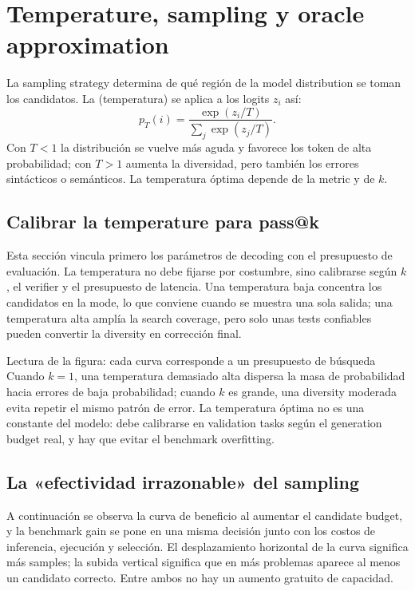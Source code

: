 \section{Temperature, sampling y oracle approximation}

La sampling strategy determina de qué región de la model distribution se toman los candidatos. La  (temperatura) se aplica a los logits $z_i$ así:
\[
p_T(i)=\frac{\exp(z_i/T)}{\sum_j\exp(z_j/T)}.
\]
Con $T<1$ la distribución se vuelve más aguda y favorece los token de alta probabilidad; con $T>1$ aumenta la diversidad, pero también los errores sintácticos o semánticos. La temperatura óptima depende de la metric y de $k$.

\subsection{Calibrar la temperature para pass@k}

Esta sección vincula primero los parámetros de decoding con el presupuesto de evaluación. La temperatura no debe fijarse por costumbre, sino calibrarse según $k$, el verifier y el presupuesto de latencia. Una temperatura baja concentra los candidatos en la mode, lo que conviene cuando se muestra una sola salida; una temperatura alta amplía la search coverage, pero solo unas tests confiables pueden convertir la diversity en corrección final.


\begin{knowledgebox}{Lectura de la figura: cada curva corresponde a un presupuesto de búsqueda}
Cuando $k=1$, una temperatura demasiado alta dispersa la masa de probabilidad hacia errores de baja probabilidad; cuando $k$ es grande, una diversity moderada evita repetir el mismo patrón de error. La temperatura óptima no es una constante del modelo: debe calibrarse en validation tasks según el generation budget real, y hay que evitar el benchmark overfitting.
\end{knowledgebox}

\subsection{La «efectividad irrazonable» del sampling}

A continuación se observa la curva de beneficio al aumentar el candidate budget, y la benchmark gain se pone en una misma decisión junto con los costos de inferencia, ejecución y selección. El desplazamiento horizontal de la curva significa más samples; la subida vertical significa que en más problemas aparece al menos un candidato correcto. Entre ambos no hay un aumento gratuito de capacidad.

